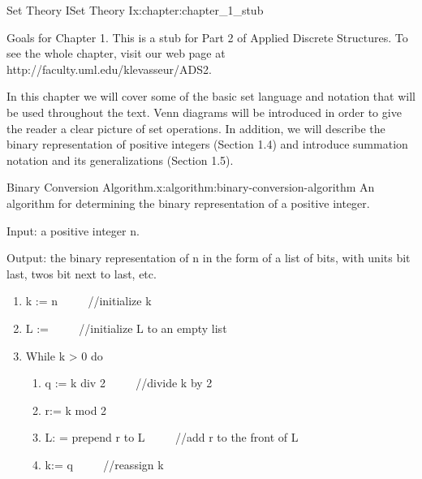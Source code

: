 \documentclass[oneside,10pt,]{book}
\numberwithin{equation}{section}
\begin{document}
\setcounter{tocdepth}{1}
\renewcommand*\contentsname{Contents}
\tableofcontents
\mainmatter
%
%
\typeout{************************************************}
\typeout{************************************************}
%
\begin{chapterptx}{Set Theory I}{}{Set Theory I}{}{}{x:chapter:chapter_1_stub}
\begin{introduction}{Goals for Chapter 1.}%
This is a stub for Part 2 of Applied Discrete Structures. To see the whole chapter, visit our web page at http:\slash{}\slash{}faculty.uml.edu\slash{}klevasseur\slash{}ADS2.%
\par
In this chapter we will cover some of the basic set language and notation that will be used throughout the text. Venn diagrams will be introduced in order to give the reader a clear picture of set operations. In addition, we will describe the binary representation of positive integers (Section 1.4) and introduce summation notation and its generalizations (Section 1.5).%
\end{introduction}%
\begin{algorithm}{Binary Conversion Algorithm.}{}{x:algorithm:binary-conversion-algorithm}%
%
An algorithm for determining the binary representation of a positive integer.%
\par
Input: a positive integer n.%
\par
Output: the binary representation of n in the form of a list of bits, with units bit last, twos bit next to last, etc.%
\par
%
\begin{enumerate}[label=(\arabic*)]
\item{}k := n \(\qquad  \)     \slash{}\slash{}initialize k%
\item{}L := \textbraceleft{} \textbraceright{} \(\qquad  \)   \slash{}\slash{}initialize L to an empty list%
\item{}While k \textgreater{} 0 do%
\par
%
\begin{enumerate}[label=(\alph*)]
\item{}q := k div 2		\(\qquad  \)	\slash{}\slash{}divide k by 2%
\item{}r:= k mod 2%
\item{}L: = prepend r to L \(\qquad  \) \slash{}\slash{}add r to the front of L%
\item{}k:= q   			\(\qquad  \)	\slash{}\slash{}reassign k%
\end{enumerate}
%
\end{enumerate}
%
\end{algorithm}
\end{chapterptx}
\end{document}
